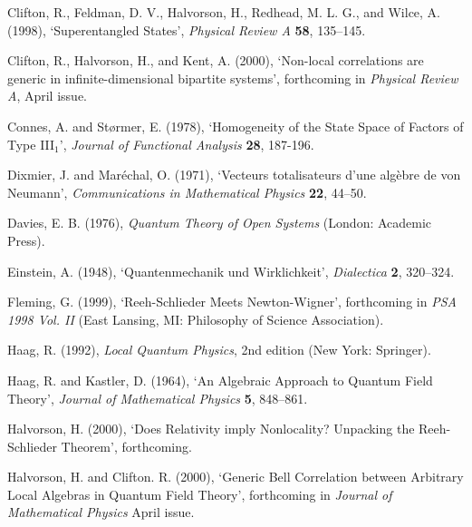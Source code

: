 \documentclass[12pt]{article}
\begin{document}
\noindent Clifton, R., Feldman, D. V., Halvorson, H., Redhead, M. L. 
G., and Wilce, A. (1998), `Superentangled States', \emph{Physical 
Review A} \textbf{58}, 135--145.\vspace{.1in}

\noindent Clifton, R., Halvorson, H., and Kent, A. (2000), `Non-local
correlations are generic in infinite-dimensional bipartite systems', 
forthcoming in \emph{Physical Review A}, April issue.\vspace{.1in}

\noindent Connes, A. and St\o rmer, E. (1978), `Homogeneity of the State Space of Factors of Type 
III$_{1}$', \emph{Journal of Functional Analysis} \textbf{28}, 187-196.\vspace{.1in}

\noindent Dixmier, J. and Mar\'{e}chal, O. (1971),
`Vecteurs totalisateurs d'une alg\`{e}bre de von Neumann',
\emph{Communications in Mathematical Physics} \textbf{22}, 44--50. \vspace{.1in}

\noindent Davies, E. B. (1976), \emph{Quantum Theory of Open Systems}  
(London: Academic Press).\vspace{.1in}

\noindent Einstein, A. (1948), `Quantenmechanik und 
Wirklichkeit', \emph{Dialectica} \textbf{2}, 320--324.\vspace{.1in}

\noindent Fleming, G. (1999), `Reeh-Schlieder Meets Newton-Wigner', 
forthcoming in \emph{PSA 1998 Vol. II} 
(East Lansing, MI: Philosophy of Science Association). \vspace{.1in} 

\noindent Haag, R. (1992), \emph{Local Quantum Physics}, 2nd edition (New York: Springer).\vspace{.1in}

\noindent Haag, R. and Kastler, D. (1964), `An Algebraic Approach 
to Quantum Field Theory', \emph{Journal of Mathematical 
Physics} \textbf{5}, 848--861.\vspace{.1in}

\noindent Halvorson, H. (2000), `Does Relativity imply Nonlocality? Unpacking 
the Reeh-Schlieder Theorem', forthcoming.\vspace{.1in}

\noindent Halvorson, H. and Clifton. R. (2000), `Generic Bell 
Correlation between Arbitrary Local Algebras in Quantum Field 
Theory', forthcoming in \emph{Journal of Mathematical Physics} April 
issue.\vspace{.1in}
\end{document}
